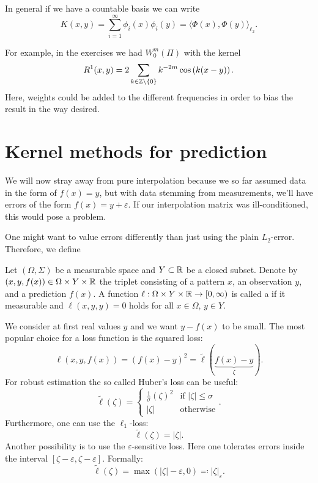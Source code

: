 \documentclass[../lecture-notes.tex]{subfiles}
\begin{document}
In general if we have a countable basis we can write
\[
	K(x, y) = \sum_{i=1}^\infty \phi_i(x) \phi_i(y) = \langle \Phi(x), \Phi(y) \rangle_{\ell_2}.
\]

For example, in the exercises we had $W_0^m(\Pi)$ with the kernel
\[
	R^1(x, y) = 2 \sum_{k \in \mathbb{Z} \setminus \{ 0 \}} k^{-2m} \cos \left( k(x-y) \right).
\]
Here, weights could be added to the different frequencies in order to bias the result in the way desired.

\section{Kernel methods for prediction} %
\label{sec:1.4}
We will now stray away from pure interpolation because we so far assumed data in the form of $f(x) = y$, but with data stemming from measurements, we'll have errors of the form $f(x) = y + \varepsilon$. If our interpolation matrix was ill-conditioned, this would pose a problem.

One might want to value errors differently than just using the plain $L_2$-error. Therefore, we define
\begin{definition} %
\label{thm:38}
Let $(\Omega, \Sigma)$ be a measurable space and $Y \subset \mathbb{R}$ be a closed subset.
Denote by $(x, y, f(x)) \in \Omega \times Y \times \mathbb{R}$ the triplet consisting of a pattern $x$, an observation $y$, and a prediction $f(x)$.
A function $\ell : \Omega \times Y \times \mathbb{R} \to [0, \infty)$ is called a  if it measurable and $\ell(x, y, y) = 0$ holds for all $x \in \Omega$, $y \in Y$.
\end{definition}
We consider at first real values $y$ and we want $y - f(x)$ to be small.
The most popular choice for a loss function is the squared loss:
\[
	\ell(x, y, f(x)) = \left( f(x) - y \right)^2 = \tilde{\ell}( \underbrace{f(x) - y}_{\zeta} ).
\]
For robust estimation the so called Huber's loss can be useful:
\[
	\tilde{\ell}(\zeta) = \begin{cases}
	\frac{1}{\sigma} (\zeta)^2 & \text{if } |\zeta| \leq \sigma \\
	|\zeta| & \text{otherwise}
	\end{cases}.
\]
Furthermore, one can use the $\ell_1$-loss:
\[
	\tilde{\ell}(\zeta) = |\zeta|.
\]
Another possibility is to use the $\varepsilon$-sensitive loss. Here one tolerates errors inside the interval $[\zeta - \varepsilon, \zeta - \varepsilon]$. Formally:
\[
	\tilde{\ell}(\zeta) = \max \left( |\zeta| - \varepsilon, 0 \right) \eqqcolon |\zeta|_{\varepsilon}.
\]
\end{document}
